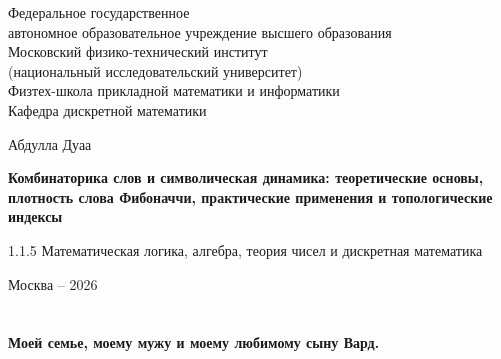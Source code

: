 \documentclass[a4paper,14pt]{extreport}
\theoremstyle{plain}
\theoremstyle{definition}
\theoremstyle{remark}
\begin{document}
	
	\clearpage
	
	
	\begin{titlepage}
		\thispagestyle{empty} 
		\centering
		{\fontsize{12}{12}\selectfont Федеральное государственное\\ автономное образовательное учреждение высшего образования\\ Московский физико-технический институт \\
			(национальный исследовательский университет) \\Физтех-школа прикладной математики и информатики\\ Кафедра дискретной математики \par}
		
		\vspace{1.5cm}
		
		\vspace{2.5cm}
		\centering
		{\Large Абдулла Дуаа  \par}
		\vspace{1cm}
		{\Large \textbf{Комбинаторика слов и символическая динамика: теоретические основы, плотность слова Фибоначчи, практические применения и топологические индексы} \par}
		\vspace{1cm}
		{\large 1.1.5 Математическая логика, алгебра, теория чисел и дискретная математика \par} 
		
		\vspace{1cm}
		
		\centering
		\vfill
		{\large Москва -- 2026 \par}
	\end{titlepage}
	
	
	\newpage
	\tableofcontents
	\newpage
	\listoffigures
	\newpage
	\listoftables
	\listofalgorithms
	\chapter*{}
	\thispagestyle{empty}
	\vspace*{\fill}
	\begin{center}
		\textbf{Моей семье, моему мужу и моему любимому сыну Вард.}
	\end{center}
	\vspace*{\fill}
	\clearpage  
\end{document}
